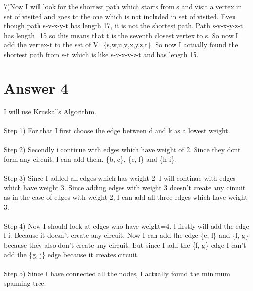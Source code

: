\documentclass[12pt]{article}
\begin{document}
7)Now I will look for the shortest path which starts from s and visit a vertex in set of visited and goes to the one which is not included in set of visited. Even though path s-v-x-y-t has length 17, it is not the shortest path. Path s-v-x-y-z-t has length=15 so this means that t is the seventh closest vertex to s. So now I add the vertex-t to the set of V=\{s,w,u,v,x,y,z,t\}. So now I actually found the shortest path from s-t which is like s-v-x-y-z-t and has length 15.

\section*{Answer 4}
I will use Kruskal's Algorithm.\\\\
Step 1) For that I first choose the edge between d and k as a lowest weight.\\\\
Step 2) Secondly i continue with edges which have weight of 2. Since they dont form any circuit, I can add them. \{b, c\}, \{c, f\} and \{h-i\}.\\\\
Step 3) Since I added all edges which has weight 2. I will continue with edges which have weight 3. Since adding edges with weight 3 doesn't create any circuit as in the case of edges with weight 2, I can add all three edges which have weight 3.\\\\
Step 4) Now I should look at edges who have weight=4. I firstly will add the edge f-i. Because it doesn't create any circuit. Now I can add the edge \{e, f\}  and \{f, g\} because they also don't create any circuit. But since I add the \{f, g\} edge I can't add the \{g, j\} edge because it creates circuit.\\\\
Step 5) Since I have connected all the nodes, I actually found the minimum spanning tree.\\\\\\
\end{document}
